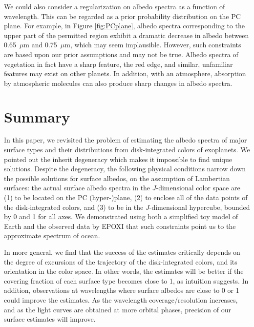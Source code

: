 \documentclass[iop,numberedappendix,apj]{emulateapj}
\begin{document}
We could also consider a regularization on albedo spectra as a function of wavelength. 
This can be regarded as a prior probability distribution on the PC plane. 
For example, in Figure \ref{fig:PCplane}, albedo spectra corresponding to the upper part of the permitted region exhibit a dramatic decrease in albedo between 0.65~$\mu $m and 0.75~$\mu $m, which may seem implausible. 
However, such constraints are based upon our prior assumptions and may not be true. 
Albedo spectra of vegetation in fact have a sharp feature, the red edge, and similar, unfamiliar features may exist on other planets. 
In addition, with an atmosphere, absorption by atmospheric molecules can also produce sharp changes in albedo spectra. 


\section{Summary}
\label{s:conclusion}

In this paper, we revisited the problem of estimating the albedo spectra of major surface types and their distributions from disk-integrated colors of exoplanets. 
We pointed out the inherit degeneracy which makes it impossible to find unique solutions. 
Despite the degeneracy, the following physical conditions narrow down the possible solutions for surface albedos, on the assumption of Lambertian surfaces:
the actual surface albedo spectra in the $J$-dimensional color space are (1) to be located on the PC (hyper-)plane, (2) to enclose all of the data points of the disk-integrated colors, and (3) to be in the $J$-dimensional hypercube, bounded by 0 and 1 for all axes. %
We demonstrated using both a simplified toy model of Earth and the observed data by EPOXI that such constraints point us to the approximate spectrum of ocean. 

In more general, we find that the success of the estimates critically depends on the degree of excursions of the trajectory of the disk-integrated colors, and its orientation in the color space.  %
In other words, the estimates will be better if the covering fraction of each surface type becomes close to 1, as intuition suggests. 
In addition, observations at wavelengths where surface albedos are close to 0 or 1 could improve the estimates. 
As the wavelength coverage/resolution increases, and as the light curves are obtained at more orbital phases, precision of our surface estimates will improve. 
\end{document}

